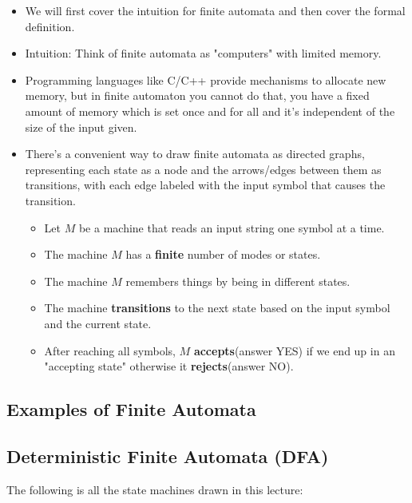 \documentclass{article}
\begin{document}
\begin{itemize}
    \item We will first cover the intuition for finite automata and then cover the formal definition.
    \item Intuition: Think of finite automata as "computers" with limited memory.
    \item Programming languages like C/C++ provide mechanisms to allocate new memory, but in finite automaton you cannot do that, you have a fixed amount of memory which is set once and for all and it's independent of the size of the input given.
    \item There's a convenient way to draw finite automata as directed graphs, representing each state as a node and the arrows/edges between them as transitions, with each edge labeled with the input symbol that causes the transition.
    \begin{itemize}
    \item Let $M$ be a machine that reads an input string one symbol at a time.
    \item The machine $M$ has a \textbf{finite} number of modes or states.
    \item The machine $M$ remembers things by being in different states.
    \item The machine \textbf{transitions} to the next state based on the input symbol and the current state.
    \item After reaching all symbols, $M$ \textbf{accepts}(answer YES) if we end up in an "accepting state" otherwise it \textbf{rejects}(answer NO).
    \end{itemize}
\end{itemize}

\subsection*{Examples of Finite Automata}

\subsection*{Deterministic Finite Automata (DFA)}


The following is all the state machines drawn in this lecture:
\end{document}
